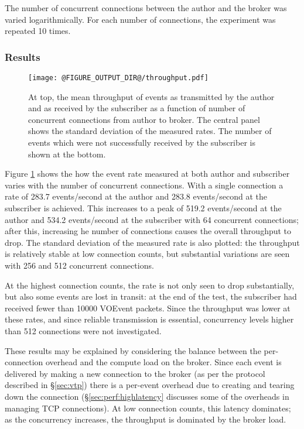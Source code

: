 \documentclass[5p,authoryear]{elsarticle}
\begin{document}
The number of concurrent connections between the author and the broker was
varied logarithmically. For each number of connections, the experiment was
repeated 10 times.

\subsubsection{Results}
\label{sec:perf:total:results}

\begin{figure}
  \begin{center}
  \texttt{[image: @FIGURE\_OUTPUT\_DIR@/throughput.pdf]}
  \end{center}

  \caption{At top, the mean throughput of events as transmitted by
  the author and as received by the subscriber as a function of number of
  concurrent connections from author to broker. The central panel shows the
  standard deviation of the measured rates. The number of events which were
  not successfully received by the subscriber is shown at the bottom.}

  \label{fig:throughput}
\end{figure}

Figure \ref{fig:throughput} shows the how the event rate measured at both
author and subscriber varies with the number of concurrent connections. With a
single connection a rate of 283.7 events/second at the author and 283.8
events/second at the subscriber is achieved. This increases to a peak of 519.2
events/second at the author and 534.2 events/second at the subscriber with 64
concurrent connections; after this, increasing he number of connections causes
the overall throughput to drop. The standard deviation of the measured rate is
also plotted: the throughput is relatively stable at low connection counts,
but substantial variations are seen with 256 and 512 concurrent connections.

At the highest connection counts, the rate is not only seen to drop
substantially, but also some events are lost in transit: at the end of the
test, the subscriber had received fewer than 10000 VOEvent packets. Since the
throughput was lower at these rates, and since reliable transmission is
essential, concurrency levels higher than 512 connections were not
investigated.

These results may be explained by considering the balance between the
per-connection overhead and the compute load on the broker. Since each event
is delivered by making a new connection to the broker (as per the protocol
described in \S\ref{sec:vtp}) there is a per-event overhead due to creating
and tearing down the connection (\S\ref{sec:perf:highlatency} discusses some
of the overheads in managing TCP connections). At low connection counts, this
latency dominates; as the concurrency increases, the throughput is dominated
by the broker load.
\end{document}
